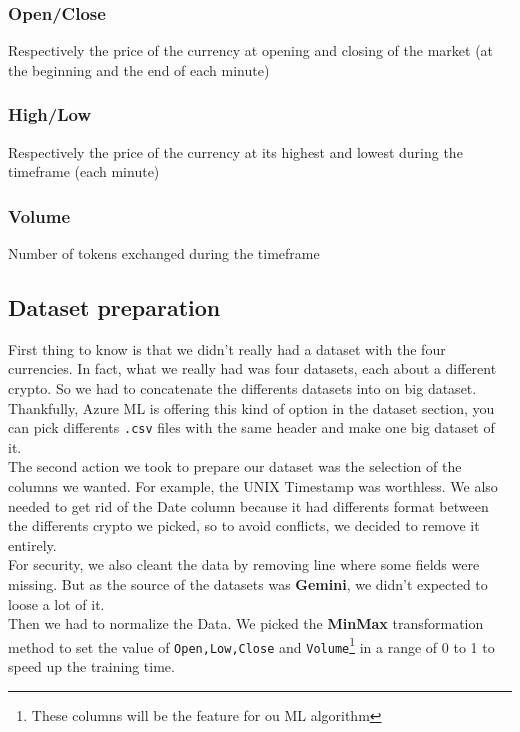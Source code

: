 \documentclass[conference]{IEEEtran}
\begin{document}
\subsubsection*{Open/Close} Respectively the price of the currency at opening and closing of the market (at the beginning and the end of each minute)\\

\subsubsection*{High/Low} Respectively the price of the currency at its highest and lowest during the timeframe (each minute)\\

\subsubsection*{Volume} Number of tokens exchanged during the timeframe


\subsection{Dataset preparation}

First thing to know is that we didn't really had a dataset with the four currencies. In fact, what we really had was four datasets, each about a different crypto. So we had to concatenate the differents datasets into on big dataset. Thankfully, Azure ML is offering this kind of option in the dataset section, you can pick differents \texttt{.csv} files with the same header and make one big dataset of it.\\

The second action we took to prepare our dataset was the selection of the columns we wanted. For example, the UNIX Timestamp was worthless. We also needed to get rid of the Date column because it had differents format between the differents crypto we picked, so to avoid conflicts, we decided to remove it entirely.\\

For security, we also cleant the data by removing line where some fields were missing. But as the source of the datasets was \textbf{Gemini}, we didn't expected to loose a lot of it.\\

Then we had to normalize the Data. We picked the \textbf{MinMax} transformation method to set the value of \texttt{Open,Low,Close} and \texttt{Volume}\footnote{These columns will be the feature for ou ML algorithm} in a range of 0 to 1 to speed up the training time.
\end{document}
